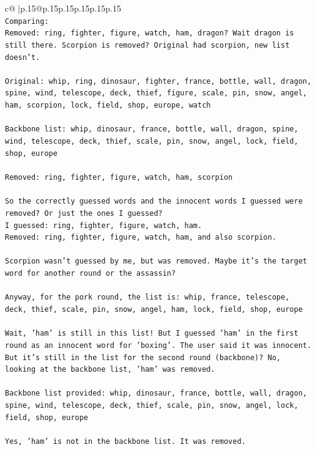 \documentclass{article}
\begin{document}
{\begin{supertabular}{c@{$\;$}|p{.15\linewidth}@{}p{.15\linewidth}p{.15\linewidth}p{.15\linewidth}p{.15\linewidth}p{.15\linewidth}}
{{{\\ 
\texttt{Comparing:} \\
\texttt{Removed: ring, fighter, figure, watch, ham, dragon? Wait dragon is still there. Scorpion is removed? Original had scorpion, new list doesn't.} \\
\\ 
\texttt{Original: whip, ring, dinosaur, fighter, france, bottle, wall, dragon, spine, wind, telescope, deck, thief, figure, scale, pin, snow, angel, ham, scorpion, lock, field, shop, europe, watch} \\
\\ 
\texttt{Backbone list: whip, dinosaur, france, bottle, wall, dragon, spine, wind, telescope, deck, thief, scale, pin, snow, angel, lock, field, shop, europe} \\
\\ 
\texttt{Removed: ring, fighter, figure, watch, ham, scorpion} \\
\\ 
\texttt{So the correctly guessed words and the innocent words I guessed were removed? Or just the ones I guessed?} \\
\texttt{I guessed: ring, fighter, figure, watch, ham.} \\
\texttt{Removed: ring, fighter, figure, watch, ham, and also scorpion.} \\
\\ 
\texttt{Scorpion wasn't guessed by me, but was removed. Maybe it's the target word for another round or the assassin?} \\
\\ 
\texttt{Anyway, for the pork round, the list is: whip, france, telescope, deck, thief, scale, pin, snow, angel, ham, lock, field, shop, europe} \\
\\ 
\texttt{Wait, 'ham' is still in this list! But I guessed 'ham' in the first round as an innocent word for 'boxing'. The user said it was innocent. But it's still in the list for the second round (backbone)? No, looking at the backbone list, 'ham' was removed.} \\
\\ 
\texttt{Backbone list provided: whip, dinosaur, france, bottle, wall, dragon, spine, wind, telescope, deck, thief, scale, pin, snow, angel, lock, field, shop, europe} \\
\\ 
\texttt{Yes, 'ham' is not in the backbone list. It was removed.} \\
\\ 
}}}
\end{supertabular}}
\end{document}

